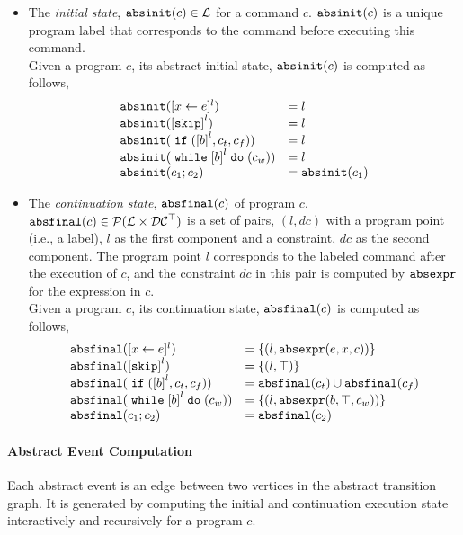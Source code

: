 %
\begin{itemize}
 \item The \emph{initial state}, $\mathtt{abs}{\mathtt{init}}(c) \in \mathcal{L}$
 for a command $c$.
 $\mathtt{abs}{\mathtt{init}}(c)$ is a unique program label that corresponds to the command before executing this command. 
\\
Given a program $c$, its abstract initial state, $\mathtt{abs}{\mathtt{init}}(c)$ is computed as follows,
%
\[
 \begin{array}{ll}
 \absinit(\clabel{\assign{x}{\expr}}{}^l) & = l \\
 \absinit(\clabel{\eskip}^{l}) & = l \\
 \absinit(\eif (\clabel{\bexpr}^l, c_t, c_f)) & = l \\
 \absinit(\ewhile \clabel{\bexpr}^l \edo (c_w)) & = l \\
 \absinit(c_1 ; c_2) & = \absinit(c_1) \\
 \end{array}
 \]
%
%
\item The \emph{continuation state}, $\mathtt{abs}{\mathtt{final}}(c)$ of program $c$, 
$\mathtt{abs}{\mathtt{final}}(c) \in \mathcal{P}(\mathcal{L} \times \mathcal{DC}^{\top})$
is a set of pairs, $(l, dc)$ with a
program point (i.e., a label), $l$ as the first component and a constraint, 
$dc$ as the second component.
The program point $l$ corresponds to the labeled command after the execution of $c$,
and the constraint $dc$ in this pair is computed by $\mathtt{abs}{\mathtt{expr}}$ for the expression in $c$.
\\
Given a program $c$, its continuation state, $\mathtt{abs}{\mathtt{final}}(c)$ is computed as follows,
 \[
 \begin{array}{ll}
 \absfinal(\clabel{\assign{x}{\expr}}{}^l) & = \{(l, \absexpr(\expr, x, c))\} \\
 \absfinal(\clabel{\eskip}^{l}) 
 & = \{(l, \top)\} \\
 \absfinal(\eif (\clabel{\bexpr}^l, c_t, c_f)) & = \absfinal(c_t) \cup \absfinal(c_f) \\
 \absfinal(\ewhile \clabel{\bexpr}^l \edo (c_w)) & = \{(l, \absexpr(\bexpr, \top, c_w))\} \\
 \absfinal(c_1 ; c_2) & = \absfinal(c_2) \\
 \end{array}
 \]
\end{itemize}
 \paragraph{Abstract Event Computation} Each abstract event is an edge between two vertices in the abstract transition graph.
 It is generated by computing the initial and continuation execution state interactively and recursively for a program $c$.
 
